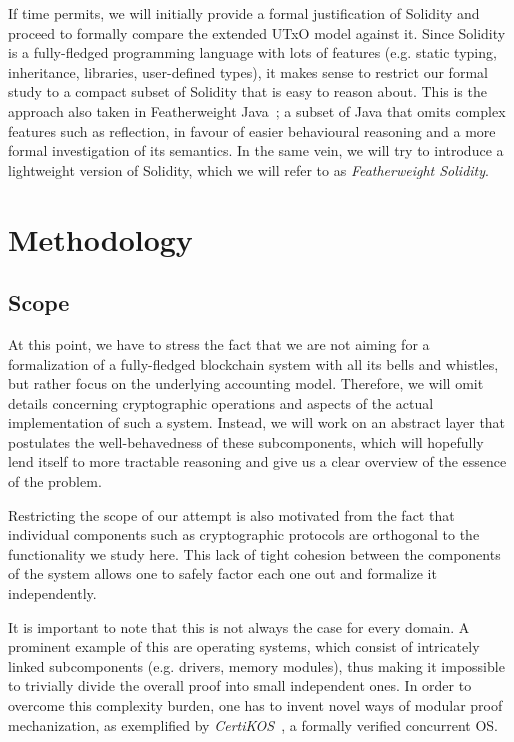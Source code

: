 \documentclass[acmsmall,nonacm=true,screen=true]{acmart}
\begin{document}
If time permits, we will initially provide a formal justification of Solidity and proceed to
formally compare the extended UTxO model against it.
Since Solidity is a fully-fledged programming language with lots of features
(e.g. static typing, inheritance, libraries, user-defined types), it makes sense to 
restrict our formal study to a compact subset of Solidity that is easy to reason about.
This is the approach also taken in Featherweight Java~\cite{featherweightjava}; a subset
of Java that omits complex features such as reflection, in favour of easier behavioural reasoning
and a more formal investigation of its semantics.
In the same vein, we will try to introduce a lightweight version of Solidity, which we will refer to as
\textit{Featherweight Solidity}.

\section{Methodology}
\label{sec:methodology}

\subsection{Scope}
At this point, we have to stress the fact that we are not aiming for a formalization of a fully-fledged 
blockchain system with all its bells and whistles, but rather focus on the underlying accounting model.
Therefore, we will omit details concerning cryptographic operations and aspects of the actual implementation
of such a system. Instead, we will work on an abstract layer that postulates the well-behavedness of these
subcomponents, which will hopefully lend itself to more tractable reasoning and
give us a clear overview of the essence of the problem.

Restricting the scope of our attempt is also motivated from the fact that individual
components such as cryptographic protocols are orthogonal to the functionality we study here.
This lack of tight cohesion between the components of the system allows one to 
safely factor each one out and formalize it independently.

It is important to note that this is not always the case for every domain. A prominent example of
this are operating systems, which consist of intricately linked subcomponents (e.g. drivers, memory modules),
thus making it impossible to trivially divide the overall proof into small independent ones.
In order to overcome this complexity burden, one has to invent novel ways of modular proof mechanization, as
exemplified by \textit{CertiKOS}~\cite{certikos}, a formally verified concurrent OS.
\end{document}
